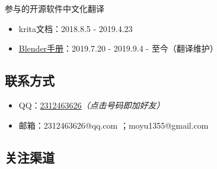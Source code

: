 \documentclass[11pt,a4paper,UTF8,titlepage]{ctexart} %
\begin{document}
    \noindent 参与的开源软件中文化翻译

    \begin{itemize}
        \item krita文档：2018.8.5 - 2019.4.23
        \item \href{https://www.blendercn.org/5812.html?tdsourcetag=s_pctim_aiomsg}{Blender手册}：2019.7.20 - 2019.9.4 - 至今（翻译维护）
    \end{itemize}

    \subsection*{\bfseries \sffamily \hypertarget{contact}{联系方式}}


    \begin{itemize}
        \item QQ：\href{tencent://AddContact/?fromId=45&fromSubId=1&subcmd=all&uin=2312463626&website=www.oicqzone.com}{2312463626}\emph{\color{red}（点击号码即加好友）}
        \item 邮箱：2312463626@qq.com ；moyu1355@gmail.com
    \end{itemize}

    \subsection*{\bfseries \sffamily \hypertarget{follow}{关注渠道}}
\end{document}
